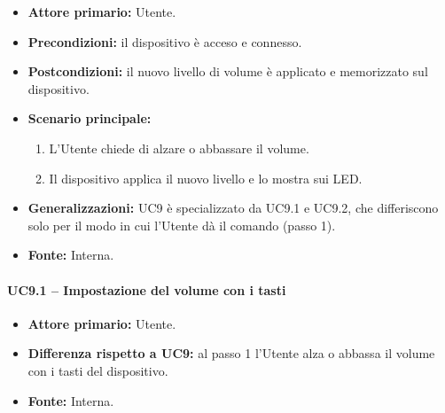 \documentclass[12pt,a4paper]{article}
\newcommand{\tightlist}{\setlength{\itemsep}{1pt}\setlength{\parskip}{0pt}}
\begin{document}
\begin{itemize}

\tightlist

\item \textbf{Attore primario:} Utente.

\item \textbf{Precondizioni:} il dispositivo è acceso e connesso.

\item \textbf{Postcondizioni:} il nuovo livello di volume è applicato e memorizzato sul dispositivo.

\item \textbf{Scenario principale:}

\begin{enumerate}

\tightlist

\item L'Utente chiede di alzare o abbassare il volume.

\item Il dispositivo applica il nuovo livello e lo mostra sui LED.

\end{enumerate}

\item \textbf{Generalizzazioni:} UC9 è specializzato da UC9.1 e UC9.2, che differiscono solo per il modo in cui l'Utente dà il comando (passo 1).

\item \textbf{Fonte:} Interna.

\end{itemize}



\paragraph{UC9.1 -- Impostazione del volume con i tasti}

\begin{itemize}

\tightlist

\item \textbf{Attore primario:} Utente.

\item \textbf{Differenza rispetto a UC9:} al passo 1 l'Utente alza o abbassa il volume con i tasti del dispositivo.

\item \textbf{Fonte:} Interna.

\end{itemize}
\end{document}
